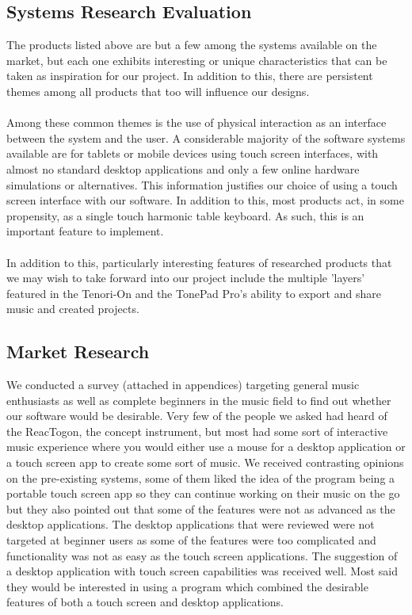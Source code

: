 \documentclass[10pt,a4paper]{article}
\begin{document}
\subsection{Systems Research Evaluation}
The products listed above are but a few among the systems available on the market, but each one exhibits interesting or unique characteristics that can be taken as inspiration for our project. In addition to this, there are persistent themes among all products that too will influence our designs.\\
\\
Among these common themes is the use of physical interaction as an interface between the system and the user. A considerable majority of the software systems available are for tablets or mobile devices using touch screen interfaces, with almost no standard desktop applications and only a few online hardware simulations or alternatives. This information justifies our choice of using a touch screen interface with our software. In addition to this, most products act, in some propensity, as a single touch harmonic table keyboard. As such, this is an important feature to implement.\\
\\
In addition to this, particularly interesting features of researched products that we may wish to take forward into our project include the multiple 'layers' featured in the Tenori-On and the TonePad Pro's ability to export and share music and created projects. 

\pagebreak
\subsection{Market Research}
We conducted a survey (attached in appendices) targeting general music enthusiasts as well as complete beginners in the music field to find out whether our software would be desirable. Very few of the people we asked had heard of the ReacTogon, the concept instrument, but most had some sort of interactive music experience where you would either use a mouse for a desktop application or a touch screen app to create some sort of music. We received contrasting opinions on the pre-existing systems, some of them liked the idea of the program being a portable touch screen app so they can continue working on their music on the go but they also pointed out that some of the features were not as advanced as the desktop applications. The desktop applications that were reviewed were not targeted at beginner users as some of the features were too complicated and functionality was not as easy as the touch screen applications. The suggestion of a desktop application with touch screen capabilities was received well. Most said they would be interested in using a program which combined the desirable features of both a touch screen and desktop applications.
 
\end{document}
